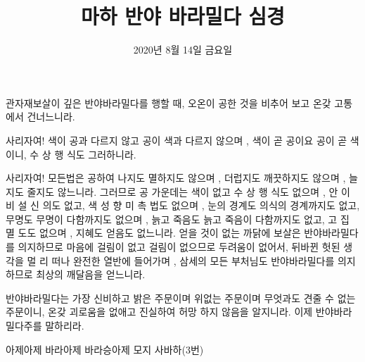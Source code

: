 \documentclass[25pt, a2paper ]{tikzposter}
\title{ 마하 반야 바라밀다 심경 }
\author{ 2020년 8월 14일 금요일 }
\begin{document}
	\maketitle





			{
				\begin{LARGE}

관자재보살이 깊은 반야바라밀다를 행할 때,
오온이 공한 것을 비추어 보고 온갖 고통에서 건너느니라.

사리자여! 색이 공과 다르지 않고 공이 색과 다르지 않으며 ,
색이 곧 공이요 공이 곧 색이니, 수 상 행 식도 그러하니라.

사리자여! 모든법은 공하여 나지도 멸하지도 않으며 ,
더럽지도 깨끗하지도 않으며 , 늘지도 줄지도 않느니라.
그러므로 공 가운데는 색이 없고 수 상 행 식도 없으며 ,
안 이 비 설 신 의도 없고,
색 성 향 미 촉 법도 없으며 ,
눈의 경계도 의식의 경계까지도 없고,
무명도 무명이 다함까지도 없으며 ,
늙고 죽음도 늙고 죽음이 다함까지도 없고,
고 집 멸 도도 없으며 , 지혜도 얻음도 없느니라.
얻을 것이 없는 까닭에 보살은 반야바라밀다를 의지하므로
마음에 걸림이 없고 걸림이 없으므로 두려움이 없어서,
뒤바뀐 헛된 생각을 멀 리 떠나 완전한 열반에 들어가며 ,
삼세의 모든 부처님도 반야바라밀다를 의지하므로
최상의 깨달음을 얻느니라.

반야바라밀다는 가장 신비하고 밝은 주문이며 위없는 주문이며
무엇과도 견줄 수 없는 주문이니,
온갖 괴로움을 없애고 진실하여 허망 하지 않음을 알지니라.
이제 반야바라밀다주를 말하리라.

아제아제 바라아제 바라승아제 모지 사바하(3번)

				\end{LARGE}
			}
\end{document}

